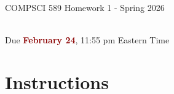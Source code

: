 \documentclass{article}
\begin{document}
\newpage
\vspace*{1cm}
\begin{center}
    \begin{Large}
    COMPSCI 589 Homework 1 - Spring 2026
    \end{Large}
    \\
    \vspace{0.15cm}
    Due \textcolor{darkred}{\textbf{February 24}}, 11:55 pm Eastern Time
\end{center}



\vspace{0.5cm}
\section*{Instructions}
\vspace{0.5cm}
\end{document}
